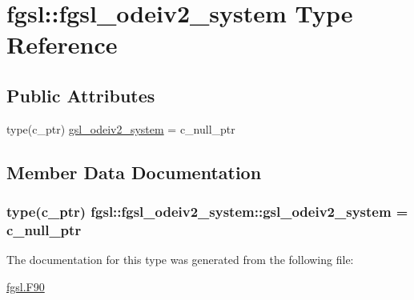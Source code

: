 \hypertarget{structfgsl_1_1fgsl__odeiv2__system}{}\section{fgsl\+:\+:fgsl\+\_\+odeiv2\+\_\+system Type Reference}
\label{structfgsl_1_1fgsl__odeiv2__system}
\subsection*{Public Attributes}
\begin{DoxyCompactItemize}
\item 
type(c\+\_\+ptr) \hyperlink{structfgsl_1_1fgsl__odeiv2__system_ab4c71db38dc1a1f7f123af8266dc11aa}{gsl\+\_\+odeiv2\+\_\+system} = c\+\_\+null\+\_\+ptr
\end{DoxyCompactItemize}


\subsection{Member Data Documentation}
\hypertarget{structfgsl_1_1fgsl__odeiv2__system_ab4c71db38dc1a1f7f123af8266dc11aa}{}
\subsubsection[{gsl\+\_\+odeiv2\+\_\+system}]{\setlength{\rightskip}{0pt plus 5cm}type(c\+\_\+ptr) fgsl\+::fgsl\+\_\+odeiv2\+\_\+system\+::gsl\+\_\+odeiv2\+\_\+system = c\+\_\+null\+\_\+ptr}\label{structfgsl_1_1fgsl__odeiv2__system_ab4c71db38dc1a1f7f123af8266dc11aa}


The documentation for this type was generated from the following file\+:\begin{DoxyCompactItemize}
\item 
\hyperlink{fgsl_8F90}{fgsl.\+F90}\end{DoxyCompactItemize}
